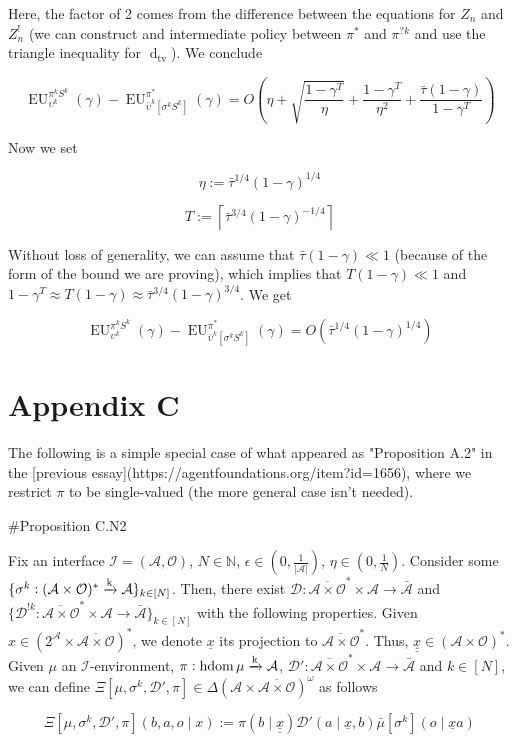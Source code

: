 \documentclass[a4paper]{article}
\newcommand{\AB}[1]{\left[#1\right]}
\newcommand{\Dtv}{\operatorname{d}_{\text{tv}}}
\newcommand{\Nats}{\mathbb{N}}
\newcommand{\Abs}[1]{\left\vert #1 \right\vert}
\newcommand{\Ceil}[1]{\left\lceil #1 \right\rceil}
\newcommand{\M}{\xrightarrow{\textnormal{k}}}
\newcommand{\Ob}{\mathcal{O}}
\newcommand{\A}{\mathcal{A}}
\newcommand{\In}{\mathcal{I}}
\newcommand{\FH}{(\A \times \Ob)^*}
\newcommand{\Ada}{\bar{\A}}
\newcommand{\Adao}{\overline{\A \times \Ob}}
\newcommand{\Adfh}{\Adao^*}
\DeclareMathOperator{\HD}{hdom}
\newcommand{\EU}{\operatorname{EU}}
\newcommand{\Dl}{\mathcal{D}}
\begin{document}
Here, the factor of 2 comes from the difference between the equations for $Z_n$ and $Z^!_n$ (we can construct and intermediate policy between $\pi^*$ and $\pi^{?k}$ and use the triangle inequality for $\Dtv$). We conclude

$$\EU^{\pi^k S^k}_{\upsilon^k}(\gamma)-\EU^{\pi^{*}}_{\bar{\upsilon}^k\AB{\sigma^k S^k}}(\gamma) = O\left(\eta+\sqrt{\frac{1-\gamma^T}{\eta}} +\frac{1-\gamma^T}{\eta^2}+\frac{\bar{\tau}(1-\gamma)}{1-\gamma^T}\right)$$

Now we set 

$$\eta:=\bar{\tau}^{1/4} (1-\gamma)^{1/4}$$  

$$T:=\Ceil{\bar{\tau}^{3/4}(1-\gamma)^{-1/4}}$$

Without loss of generality, we can assume that $\bar{\tau}(1-\gamma) \ll 1$ (because of the form of the bound we are proving), which implies that $T(1-\gamma) \ll 1$ and $1-\gamma^T \approx T(1-\gamma) \approx \bar{\tau}^{3/4}(1-\gamma)^{3/4}$. We get

$$\EU^{\pi^k S^k}_{\upsilon^k}(\gamma)-\EU^{\pi^{*}}_{\bar{\upsilon}^k\AB{\sigma^k S^k}}(\gamma) = O\left(\bar{\tau}^{1/4}(1-\gamma)^{1/4}\right)$$

\section{Appendix C}

The following is a simple special case of what appeared as "Proposition A.2" in the [previous essay](https://agentfoundations.org/item?id=1656), where we restrict $\pi$ to be single-valued (the more general case isn't needed).

\#Proposition C.N2

Fix an interface $\In=(\A,\Ob)$, $N \in \Nats$, $\epsilon \in (0,\frac{1}{\Abs{\A}})$, $\eta \in (0,\frac{1}{N})$. Consider some $\{\sigma^k: \FH \M \A\}_{k \in [N]}$. Then, there exist $\Dl: \Adfh \times \A \rightarrow \Ada$ and $\{\Dl^{!k}: \Adfh \times \A \rightarrow \Ada\}_{k \in [N]}$ with the following properties. Given $x \in \left(2^\A \times \Adao\right)^*$, we denote $\underline{x}$ its projection to $\Adfh$. Thus, $\underline{\underline{x}}\in\FH$.
Given  $\mu$ an $\In$-environment, $\pi: \HD{\mu} \M \A$, $\Dl': \Adfh \times \A \rightarrow \Ada$ and $k \in [N]$, we can define $\Xi\left[\mu,\sigma^k,\Dl',\pi\right]\in \Delta\left(\A \times \Adao\right)^\omega$ as follows
 
$$\Xi\left[\mu,\sigma^k,\Dl',\pi\right]\left(b,a,o \mid x\right):=\pi\left(b \mid \underline{\underline{x}}\right)\Dl'\left(a \mid \underline{x},b\right) \bar{\mu}[\sigma^k]\left(o \mid \underline{x}a\right)$$
\end{document}
